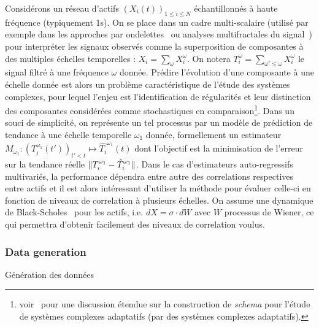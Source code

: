 {Considérons un réseau d'actifs $(X_i(t))_{1\leq i \leq N}$ échantillonnés à haute fréquence (typiquement 1s). On se place dans un cadre multi-scalaire (utilisé par exemple dans les approches par ondelettes~\cite{ramsey2002wavelets} ou analyses multifractales du signal~\cite{bouchaud2000apparent}) pour interpréter les signaux observés comme la superposition de composantes à des multiples échelles temporelles : $X_i=\sum_{\omega}{X_i^{\omega}}$. On notera $T_i^{\omega} = \sum_{\omega' \leq \omega} X_i^{\omega}$ le signal filtré à une fréquence $\omega$ donnée. Prédire l'évolution d'une composante à une échelle donnée est alors un problème caractéristique de l'étude des systèmes complexes, pour lequel l'enjeu est l'identification de régularités et leur distinction des composantes considérées comme stochastiques en comparaison\footnote{voir~\cite{gell1995quark} pour une discussion étendue sur la construction de \emph{schema} pour l'étude de systèmes complexes adaptatifs (par des systèmes complexes adaptatifs).}. Dans un souci de simplicité, on représente un tel processus par un modèle de prédiction de tendance à une échelle temporelle $\omega_1$ donnée, formellement un estimateur $M_{\omega_1} : (T_i^{\omega_1}(t'))_{t'<t} \mapsto \hat{T_i}^{\omega_1}(t)$ dont l'objectif est la minimisation de l'erreur sur la tendance réelle $\| T_i^{\omega_1} - \hat{T}_i^{\omega_1} \|$. Dans le cas d'estimateurs auto-regressifs multivariés, la performance dépendra entre autre des correlations respectives entre actifs et il est alors intéressant d'utiliser la méthode pour évaluer celle-ci en fonction de niveaux de correlation à plusieurs échelles. On assume une dynamique de Black-Scholes~\cite{jarrow1999honor} pour les actifs, i.e. $dX = \sigma\cdot dW$ avec $W$ processus de Wiener, ce qui permettra d'obtenir facilement des niveaux de correlation voulus.
}


\subsubsection*{Data generation}{Génération des données}


